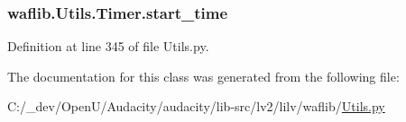 \subsubsection[{\texorpdfstring{start\+\_\+time}{start_time}}]{\setlength{\rightskip}{0pt plus 5cm}waflib.\+Utils.\+Timer.\+start\+\_\+time}\hypertarget{classwaflib_1_1_utils_1_1_timer_a07b815d67d9c3abd6bfd8d7f149bae6e}{}\label{classwaflib_1_1_utils_1_1_timer_a07b815d67d9c3abd6bfd8d7f149bae6e}


Definition at line 345 of file Utils.\+py.



The documentation for this class was generated from the following file\+:\begin{DoxyCompactItemize}
\item 
C\+:/\+\_\+dev/\+Open\+U/\+Audacity/audacity/lib-\/src/lv2/lilv/waflib/\hyperlink{lilv_2waflib_2_utils_8py}{Utils.\+py}\end{DoxyCompactItemize}
